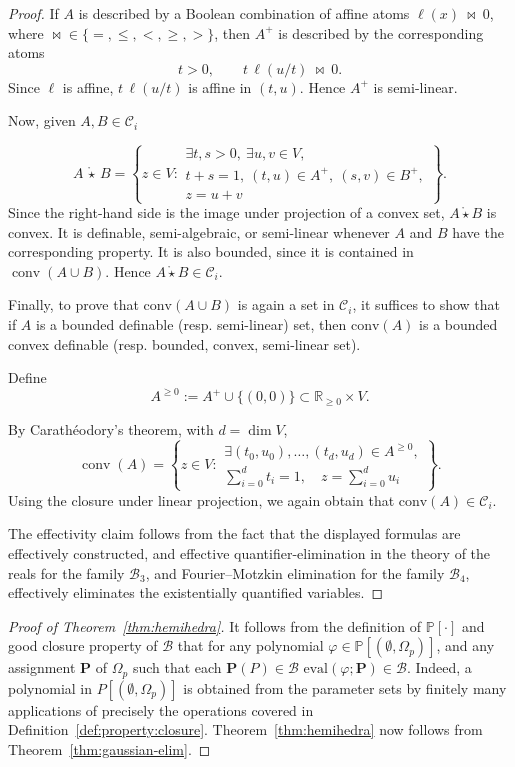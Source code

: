 \documentclass[10pt]{amsart}
\theoremstyle{plain}
\theoremstyle{definition}
\providecommand{\bP}[0]{\ensuremath{\mathbf P}\xspace}
\let\leq\leqslant
\let\geq\geqslant
\providecommand{\cmult}[0]{\ensuremath{{\,\mathring{\star}\,}}\xspace}
\providecommand{\conv}[1]{\ensuremath{\mathrm{conv}{\left({#1}\right)}\xspace}}
\providecommand{\evalmap}[0]{\ensuremath{\mathrm{eval}}\xspace}
\begin{document}
\begin{proof}
If \(A\) is described by a Boolean combination of affine atoms
\(\ell(x)\ \bowtie\ 0\), where \(\bowtie\in\{=,\leq,<,\geq,>\}\), then
\(A^+\) is described by the corresponding atoms
\[
t>0,\qquad t\,\ell(u/t)\ \bowtie\ 0.
\]
Since \(\ell\) is affine, \(t\,\ell(u/t)\) is affine in \((t,u)\). Hence
\(A^+\) is semi-linear. 

Now, given $A,B \in \mathcal{C}_i$

\[
A\cmult B
=
\left\{
z\in V:
\begin{array}{l}
\exists t,s>0,\ \exists u,v\in V,\\
t+s=1,\ (t,u)\in A^+,\ (s,v)\in B^+,\\
z=u+v
\end{array}
\right\}.
\]
Since the right-hand side is the image under projection of a convex
set, \(A\mathring\star B\) is convex. It is definable, semi-algebraic,
or semi-linear whenever \(A\) and \(B\) have the corresponding
property. It is also bounded, since it is contained in
\(\operatorname{conv}(A\cup B)\). Hence
\(A\mathring\star B\in\mathcal C_i\).


Finally, to prove that $\conv{A \cup B}$ is again a set in $\mathcal{C}_i$,
it suffices to show that if $A$ is a bounded definable (resp. semi-linear) set,
then $\conv{A}$ is a bounded convex definable (resp. bounded, convex, semi-linear set).

Define
\[
A^{\geq 0}:=A^+\cup\{(0,0)\}\subset \mathbb R_{\geq 0}\times V.
\]

By Carath\'eodory's theorem, with \(d=\dim V\),
\[
\operatorname{conv}(A)
=
\left\{
z\in V:
\begin{array}{l}
\exists (t_0,u_0),\ldots,(t_d,u_d)\in A^{\geq 0},\\
\sum_{i=0}^d t_i=1,\quad z=\sum_{i=0}^d u_i
\end{array}
\right\}.
\]
Using the closure under linear projection, we again obtain that $\conv{A} \in \mathcal{C}_i$.


The effectivity claim follows from the fact that the displayed formulas 
are effectively constructed, 
and 
effective quantifier-elimination in the theory of the reals \cite[Chapter 14]{BPRbook2}
for the family $\mathcal{B}_3$, and
Fourier--Motzkin elimination \cite{Ziegler} for the family $\mathcal{B}_4$,
effectively eliminates the existentially quantified variables.
\end{proof}


\begin{proof}[Proof of Theorem~\ref{thm:hemihedra}]
It follows from  the definition of $\mathbb{P}[\cdot]$ and good closure property of $\mathcal{B}$
    that
    for any polynomial $\varphi \in \mathbb{P}[(\emptyset,\Omega_p)]$, and any assignment $\bP$ of $\Omega_p$
    such that each $\bP(P) \in \mathcal{B}$ 
    $\evalmap(\varphi;\bP) \in \mathcal{B}$.
    Indeed, a polynomial in \(P[(\emptyset,\Omega_p)]\) is obtained from the
parameter sets by finitely many applications of precisely the operations
covered 
in Definition~\ref{def:property:closure}.
    Theorem~\ref{thm:hemihedra} now follows from Theorem~\ref{thm:gaussian-elim}.
\end{proof}
\end{document}
